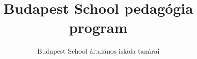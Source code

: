 \documentclass[magyar,12pt,a4paper,draft]{report}
\begin{document}
\title{Budapest School pedagógia program}
\author{Budapest School általános iskola tanárai}
\maketitle

\tableofcontents
\newpage



{}
\label{sec:bibliographyk}

\end{document}
